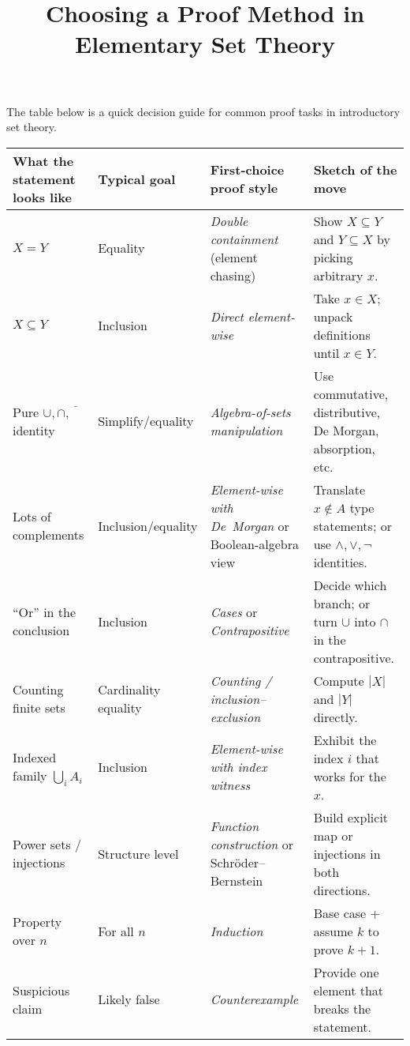 \documentclass[11pt]{article}
\title{Choosing a Proof Method in Elementary Set Theory}
\author{}
\date{}
\begin{document}
\maketitle

The table below is a quick decision guide for common proof tasks in introductory set theory.

\renewcommand{\arraystretch}{1.2}
\small
\begin{tabular}{@{}p{3.8cm} p{3cm} p{4.2cm} p{4.6cm}@{}}
\toprule
\textbf{What the statement looks like} & \textbf{Typical goal} & \textbf{First-choice proof style} & \textbf{Sketch of the move} \\
\midrule
$X = Y$ & Equality & \emph{Double containment} (element chasing) & Show $X\subseteq Y$ and $Y\subseteq X$ by picking arbitrary $x$. \\
\addlinespace
$X \subseteq Y$ & Inclusion & \emph{Direct element-wise} & Take $x\in X$; unpack definitions until $x\in Y$. \\
\addlinespace
Pure $\cup,\cap,\overline{\phantom{A}}$ identity & Simplify/equality & \emph{Algebra-of-sets manipulation} & Use commutative, distributive, De Morgan, absorption, etc. \\
\addlinespace
Lots of complements & Inclusion/equality & \emph{Element-wise with De Morgan} \newline or Boolean-algebra view & Translate $x\notin A$ type statements; or use $\land,\lor,\neg$ identities. \\
\addlinespace
“Or” in the conclusion & Inclusion & \emph{Cases} or \emph{Contrapositive} & Decide which branch; or turn $\cup$ into $\cap$ in the contrapositive. \\
\addlinespace
Counting finite sets & Cardinality equality & \emph{Counting / inclusion–exclusion} & Compute $|X|$ and $|Y|$ directly. \\
\addlinespace
Indexed family $\bigcup_{i}A_i$ & Inclusion & \emph{Element-wise with index witness} & Exhibit the index $i$ that works for the $x$. \\
\addlinespace
Power sets / injections & Structure level & \emph{Function construction} or Schröder–Bernstein & Build explicit map or injections in both directions. \\
\addlinespace
Property over $n$ & For all $n$ & \emph{Induction} & Base case + assume $k$ to prove $k+1$. \\
\addlinespace
Suspicious claim & Likely false & \emph{Counterexample} & Provide one element that breaks the statement. \\
\bottomrule
\end{tabular}
\end{document}
